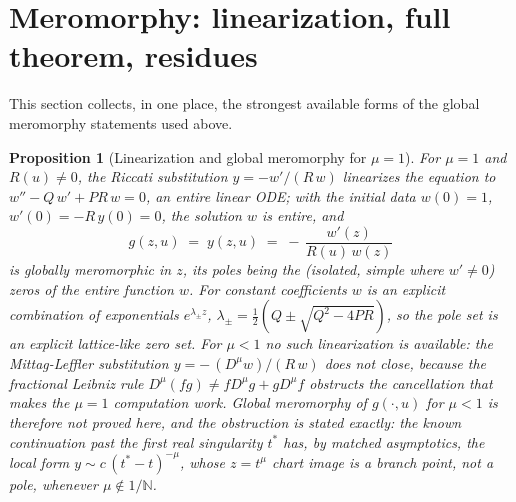 \documentclass[11pt]{article}
\newtheorem{proposition}[theorem]{Proposition}
\theoremstyle{definition}
\begin{document}
\section{Meromorphy: linearization, full theorem, residues}

This section collects, in one place, the strongest available forms of
the global meromorphy statements used above.

\begin{proposition}[Linearization and global meromorphy for $\mu=1$]\label{prop:ML}
For $\mu = 1$ and $R(u) \neq 0$, the Riccati substitution
$y = -w'/(R\,w)$ linearizes the equation to
$w'' - Q\,w' + PR\,w = 0$, an entire linear ODE; with the initial
data $w(0)=1$, $w'(0) = -R\,y(0) = 0$, the solution $w$ is entire,
and
\[
g(z,u) \;=\; y(z,u) \;=\; -\,\frac{w'(z)}{R(u)\, w(z)}
\]
is globally meromorphic in $z$, its poles being the (isolated,
simple where $w' \neq 0$) zeros of the entire function $w$. For
constant coefficients $w$ is an explicit combination of exponentials
$e^{\lambda_{\pm}z}$, $\lambda_{\pm} = \tfrac{1}{2}(Q \pm
\sqrt{Q^{2}-4PR})$, so the pole set is an explicit lattice-like
zero set. For $\mu < 1$ no such linearization is available: the
Mittag-Leffler substitution $y = -\,(D^{\mu}w)/(R\,w)$ does not
close, because the fractional Leibniz rule
$D^{\mu}(fg) \neq f D^{\mu}g + g D^{\mu}f$ obstructs the
cancellation that makes the $\mu=1$ computation work. Global
meromorphy of $g(\cdot,u)$ for $\mu < 1$ is therefore \emph{not
proved here}, and the obstruction is stated exactly: the known
continuation past the first real singularity $t^{*}$ has, by matched
asymptotics, the local form $y \sim c\,(t^{*}-t)^{-\mu}$, whose
$z = t^{\mu}$ chart image is a branch point, not a pole, whenever
$\mu \notin 1/\mathbb{N}$.
\end{proposition}
\end{document}
